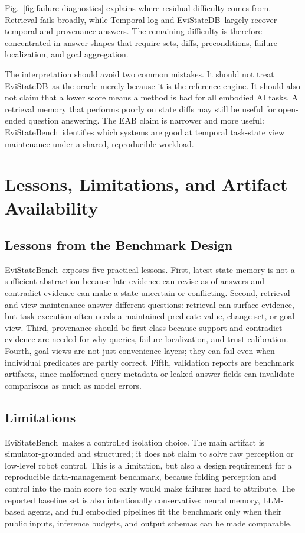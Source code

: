 \documentclass[conference]{IEEEtran}
\newcommand{\bench}{EviStateBench}
\newcommand{\engine}{EviStateDB}
\begin{document}
Fig.~\ref{fig:failure-diagnostics} explains where residual difficulty comes from. Retrieval fails broadly, while Temporal log and \engine\ largely recover temporal and provenance answers. The remaining difficulty is therefore concentrated in answer shapes that require sets, diffs, preconditions, failure localization, and goal aggregation.

The interpretation should avoid two common mistakes. It should not treat \engine\ as the oracle merely because it is the reference engine. It should also not claim that a lower score means a method is bad for all embodied AI tasks. A retrieval memory that performs poorly on state diffs may still be useful for open-ended question answering. The EAB claim is narrower and more useful: \bench\ identifies which systems are good at temporal task-state view maintenance under a shared, reproducible workload.

\section{Lessons, Limitations, and Artifact Availability}
\label{sec:discussion}

\subsection{Lessons from the Benchmark Design}

\bench\ exposes five practical lessons. First, latest-state memory is not a sufficient abstraction because late evidence can revise as-of answers and contradict evidence can make a state uncertain or conflicting. Second, retrieval and view maintenance answer different questions: retrieval can surface evidence, but task execution often needs a maintained predicate value, change set, or goal view. Third, provenance should be first-class because support and contradict evidence are needed for why queries, failure localization, and trust calibration. Fourth, goal views are not just convenience layers; they can fail even when individual predicates are partly correct. Fifth, validation reports are benchmark artifacts, since malformed query metadata or leaked answer fields can invalidate comparisons as much as model errors.

\subsection{Limitations}

\bench\ makes a controlled isolation choice. The main artifact is simulator-grounded and structured; it does not claim to solve raw perception or low-level robot control. This is a limitation, but also a design requirement for a reproducible data-management benchmark, because folding perception and control into the main score too early would make failures hard to attribute. The reported baseline set is also intentionally conservative: neural memory, LLM-based agents, and full embodied pipelines fit the benchmark only when their public inputs, inference budgets, and output schemas can be made comparable.
\end{document}
